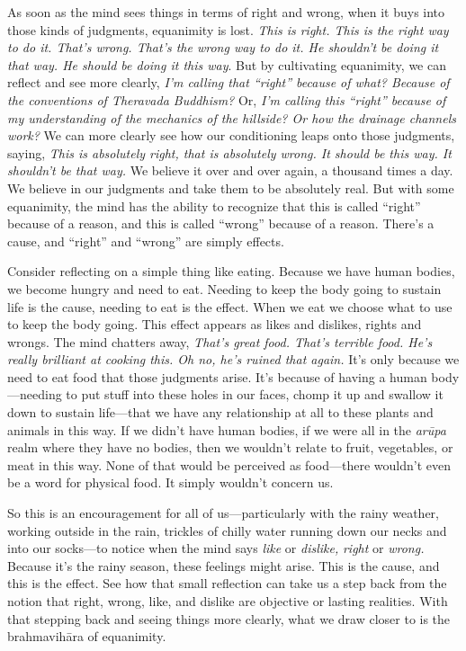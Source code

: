 As soon as the mind sees things in terms of right and wrong, when it 
buys into those kinds of judgments, equanimity is lost. \emph{This is 
right. This is the right way to do it. That's wrong. That's the wrong 
way to do it. He shouldn't be doing it that way. He should be doing it 
this way}. But by cultivating equanimity, we can reflect and see more 
clearly, \emph{I'm calling that ``right'' because of what? Because of 
the conventions of Theravada Buddhism?} Or, \emph{I'm calling this 
``right'' because of my understanding of the mechanics of the hillside? 
Or how the drainage channels work?} We can more clearly see how our 
conditioning leaps onto those judgments, saying, \emph{This is 
absolutely right, that is absolutely wrong. It should be this way. It 
shouldn't be that way.} We believe it over and over again, a thousand 
times a day. We believe in our judgments and take them to be absolutely 
real. But with some equanimity, the mind has the ability to recognize 
that this is called ``right'' because of a reason, and this is called 
``wrong'' because of a reason. There's a cause, and ``right'' and 
``wrong'' are simply effects.

Consider reflecting on a simple thing like eating. Because we have 
human bodies, we become hungry and need to eat. Needing to keep the 
body going to sustain life is the cause, needing to eat is the effect. 
When we eat we choose what to use to keep the body going. This effect 
appears as likes and dislikes, rights and wrongs. The mind chatters 
away, \emph{That's great food. That's terrible food. He's really 
brilliant at cooking this. Oh no, he's ruined that again.} It's only 
because we need to eat food that those judgments arise. It's because of 
having a human body---needing to put stuff into these holes in our 
faces, chomp it up and swallow it down to sustain life---that we have 
any relationship at all to these plants and animals in this way. If we 
didn't have human bodies, if we were all in the \emph{arūpa} realm 
where they have no bodies, then we wouldn't relate to fruit, 
vegetables, or meat in this way. None of that would be perceived as 
food---there wouldn't even be a word for physical food. It simply 
wouldn't concern us.

So this is an encouragement for all of us---particularly with the rainy 
weather, working outside in the rain, trickles of chilly water running 
down our necks and into our socks---to notice when the mind says 
\emph{like} or \emph{dislike,} \emph{right} or \emph{wrong.} Because 
it's the rainy season, these feelings might arise. This is the cause, 
and this is the effect. See how that small reflection can take us a 
step back from the notion that right, wrong, like, and dislike are 
objective or lasting realities. With that stepping back and seeing 
things more clearly, what we draw closer to is the brahmavihāra of 
equanimity.

